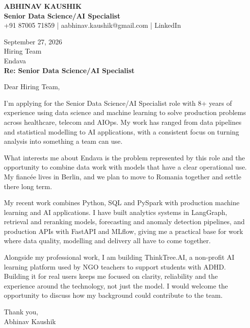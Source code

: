 \documentclass[10pt,a4paper]{article}
\begin{document}
\begin{center}
{\Large\bfseries ABHINAV KAUSHIK}\\[2pt]
{\bfseries Senior Data Science/AI Specialist}\\[2pt]
+91 87005 71859 \quad | \quad aabhinav.kaushik@gmail.com \quad | \quad LinkedIn
\end{center}
\vspace{8pt}
September 27, 2026\\[6pt]
Hiring Team\\
Endava\\[4pt]
\textbf{Re: Senior Data Science/AI Specialist}

Dear Hiring Team,

I’m applying for the Senior Data Science/AI Specialist role with 8+ years of experience using data science and machine learning to solve production problems across healthcare, telecom and AIOps. My work has ranged from data pipelines and statistical modelling to AI applications, with a consistent focus on turning analysis into something a team can use.

What interests me about Endava is the problem represented by this role and the opportunity to combine data work with models that have a clear operational use. My fiancée lives in Berlin, and we plan to move to Romania together and settle there long term.

My recent work combines Python, SQL and PySpark with production machine learning and AI applications. I have built analytics systems in LangGraph, retrieval and reranking models, forecasting and anomaly detection pipelines, and production APIs with FastAPI and MLflow, giving me a practical base for work where data quality, modelling and delivery all have to come together.

Alongside my professional work, I am building ThinkTree.AI, a non-profit AI learning platform used by NGO teachers to support students with ADHD. Building it for real users keeps me focused on clarity, reliability and the experience around the technology, not just the model. I would welcome the opportunity to discuss how my background could contribute to the team.

Thank you,\\
Abhinav Kaushik
\end{document}
